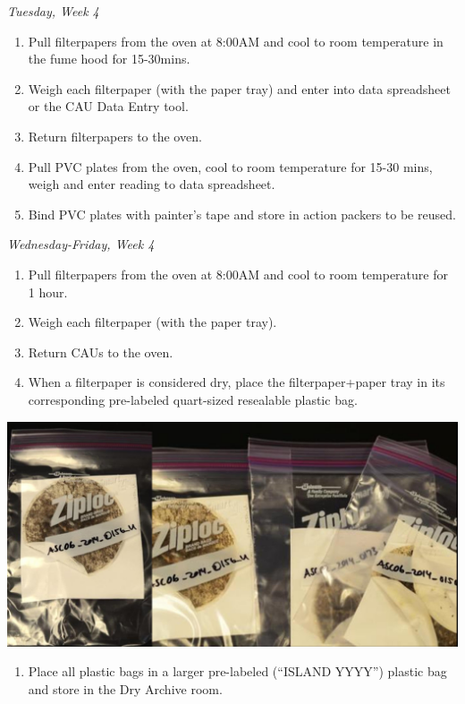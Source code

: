 \documentclass[]{book}
\providecommand{\tightlist}{%
  \setlength{\itemsep}{0pt}\setlength{\parskip}{0pt}}
\begin{document}
\emph{Tuesday, Week 4}

\begin{enumerate}
\def\labelenumi{\arabic{enumi}.}
\tightlist
\item
  Pull filterpapers from the oven at 8:00AM and cool to room temperature in the fume hood for 15-30mins.
\item
  Weigh each filterpaper (with the paper tray) and enter into data spreadsheet or the CAU Data Entry tool.
\item
  Return filterpapers to the oven.
\item
  Pull PVC plates from the oven, cool to room temperature for 15-30 mins, weigh and enter reading to data spreadsheet.
\item
  Bind PVC plates with painter's tape and store in action packers to be reused.
\end{enumerate}

\emph{Wednesday-Friday, Week 4}

\begin{enumerate}
\def\labelenumi{\arabic{enumi}.}
\tightlist
\item
  Pull filterpapers from the oven at 8:00AM and cool to room temperature for 1 hour.
\item
  Weigh each filterpaper (with the paper tray).
\item
  Return CAUs to the oven.
\item
  When a filterpaper is considered dry, place the filterpaper+paper tray in its corresponding pre-labeled quart-sized resealable plastic bag.
\end{enumerate}

\includegraphics{images/DailyTasks15.jpg}

\begin{enumerate}
\def\labelenumi{\arabic{enumi}.}
\setcounter{enumi}{4}
\tightlist
\item
  Place all plastic bags in a larger pre-labeled (``ISLAND YYYY'') plastic bag and store in the Dry Archive room.
\end{enumerate}
\end{document}
